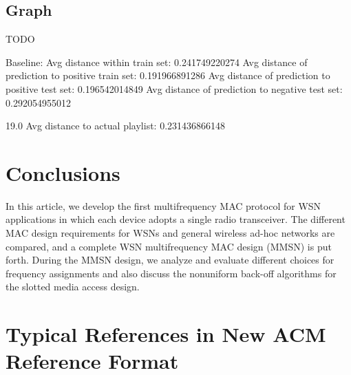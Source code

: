 \documentclass[acmtog]{acmart}
\begin{document}
\subsection{Graph}

TODO

Baseline: Avg distance within train set:          0.241749220274
Avg distance of prediction to positive train set: 0.191966891286
Avg distance of prediction to positive test set:  0.196542014849
Avg distance of prediction to negative test set:  0.292054955012

19.0
Avg distance to actual playlist: 0.231436866148

\section{Conclusions}

In this article, we develop the first multifrequency MAC protocol for
WSN applications in which each device adopts a
single radio transceiver. The different MAC design requirements for
WSNs and general wireless ad-hoc networks are
compared, and a complete WSN multifrequency MAC design (MMSN) is
put forth. During the MMSN design, we analyze and evaluate different
choices for frequency assignments and also discuss the nonuniform
back-off algorithms for the slotted media access design.


\section{Typical References in New ACM Reference Format}
\end{document}
